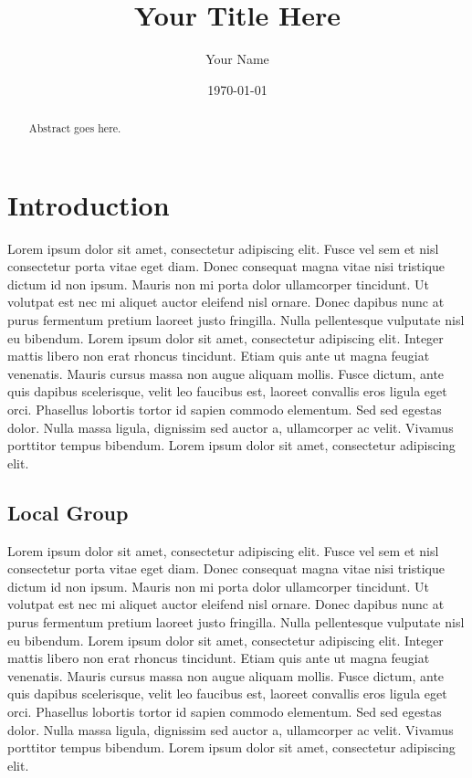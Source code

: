 \documentclass[english, oneside]{HYgradu}
\title{Your Title Here}
\author{Your Name}
\date{\today}
\begin{document}
\maketitle

\begin{abstract}
Abstract goes here.
\end{abstract}

\mytableofcontents



\chapter{Introduction}

Lorem ipsum dolor sit amet, consectetur adipiscing elit. Fusce vel sem et nisl consectetur porta vitae eget diam. Donec consequat magna vitae nisi tristique dictum id non ipsum. Mauris non mi porta dolor ullamcorper tincidunt. Ut volutpat est nec mi aliquet auctor eleifend nisl ornare. Donec dapibus nunc at purus fermentum pretium laoreet justo fringilla. Nulla pellentesque vulputate nisl eu bibendum. Lorem ipsum dolor sit amet, consectetur adipiscing elit. Integer mattis libero non erat rhoncus tincidunt. Etiam quis ante ut magna feugiat venenatis. Mauris cursus massa non augue aliquam mollis. Fusce dictum, ante quis dapibus scelerisque, velit leo faucibus est, laoreet convallis eros ligula eget orci. Phasellus lobortis tortor id sapien commodo elementum. Sed sed egestas dolor. Nulla massa ligula, dignissim sed auctor a, ullamcorper ac velit. Vivamus porttitor tempus bibendum. Lorem ipsum dolor sit amet, consectetur adipiscing elit.
\section{Local Group}
Lorem ipsum dolor sit amet, consectetur adipiscing elit. Fusce vel sem et nisl consectetur porta vitae eget diam. Donec consequat magna vitae nisi tristique dictum id non ipsum. Mauris non mi porta dolor ullamcorper tincidunt. Ut volutpat est nec mi aliquet auctor eleifend nisl ornare. Donec dapibus nunc at purus fermentum pretium laoreet justo fringilla. Nulla pellentesque vulputate nisl eu bibendum. Lorem ipsum dolor sit amet, consectetur adipiscing elit. Integer mattis libero non erat rhoncus tincidunt. Etiam quis ante ut magna feugiat venenatis. Mauris cursus massa non augue aliquam mollis. Fusce dictum, ante quis dapibus scelerisque, velit leo faucibus est, laoreet convallis eros ligula eget orci. Phasellus lobortis tortor id sapien commodo elementum. Sed sed egestas dolor. Nulla massa ligula, dignissim sed auctor a, ullamcorper ac velit. Vivamus porttitor tempus bibendum. Lorem ipsum dolor sit amet, consectetur adipiscing elit.
\end{document}
